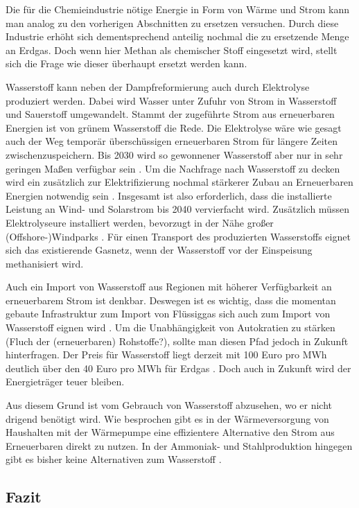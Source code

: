 Die für die Chemieindustrie nötige Energie in Form von Wärme und Strom kann man analog zu den vorherigen Abschnitten zu ersetzen versuchen. Durch diese Industrie erhöht sich dementsprechend anteilig nochmal die zu ersetzende Menge an Erdgas. Doch wenn hier Methan als chemischer Stoff eingesetzt wird, stellt sich die Frage wie dieser überhaupt ersetzt werden kann.

Wasserstoff kann neben der Dampfreformierung auch durch Elektrolyse produziert werden. Dabei wird Wasser unter Zufuhr von Strom in Wasserstoff und Sauerstoff umgewandelt. Stammt der zugeführte Strom aus erneuerbaren Energien ist von grünem Wasserstoff die Rede. Die Elektrolyse wäre wie gesagt auch der Weg temporär überschüssigen erneuerbaren Strom für längere Zeiten zwischenzuspeichern. Bis 2030 wird so gewonnener Wasserstoff aber nur in sehr geringen Maßen verfügbar sein \cite{kopernikus}. Um die Nachfrage nach Wasserstoff zu decken wird ein zusätzlich zur Elektrifizierung nochmal stärkerer Zubau an Erneuerbaren Energien notwendig sein \cite{agora-wasserstoff}. Insgesamt ist also erforderlich, dass die installierte Leistung an Wind- und Solarstrom bis 2040 vervierfacht wird. 
Zusätzlich müssen Elektrolyseure installiert werden, bevorzugt in der Nähe großer (Offshore-)Windparks \cite{ei1}. Für einen Transport des produzierten Wasserstoffs eignet sich das existierende Gasnetz, wenn der Wasserstoff vor der Einspeisung methanisiert wird.

Auch ein Import von Wasserstoff aus Regionen mit höherer Verfügbarkeit an erneuerbarem Strom ist denkbar. Deswegen ist es wichtig, dass die momentan gebaute Infrastruktur zum Import von Flüssiggas sich auch zum Import von Wasserstoff eignen wird \cite{leo}. Um die Unabhängigkeit von Autokratien zu stärken (Fluch der (erneuerbaren) Rohstoffe?), sollte man diesen Pfad jedoch in Zukunft hinterfragen.
Der Preis für Wasserstoff liegt derzeit mit 100 Euro pro MWh deutlich über den 40 Euro pro MWh für Erdgas \cite{rnd}. Doch auch in Zukunft wird der Energieträger teuer bleiben.

Aus diesem Grund ist vom Gebrauch von Wasserstoff abzusehen, wo er nicht drigend benötigt wird. Wie besprochen gibt es in der Wärmeversorgung von Haushalten mit der Wärmepumpe eine effizientere Alternative den Strom aus Erneuerbaren direkt zu nutzen. In der Ammoniak- und Stahlproduktion hingegen gibt es bisher keine Alternativen zum Wasserstoff \cite{kopernikus}.

\subsection{Fazit}

